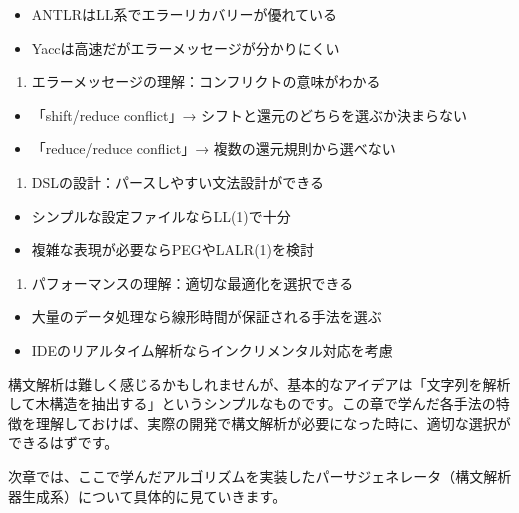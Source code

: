 \begin{itemize}
\tightlist
\item
  ANTLRはLL系でエラーリカバリーが優れている
\item
  Yaccは高速だがエラーメッセージが分かりにくい
\end{itemize}

\begin{enumerate}
\def\labelenumi{\arabic{enumi}.}
\setcounter{enumi}{1}
\tightlist
\item
  エラーメッセージの理解：コンフリクトの意味がわかる
\end{enumerate}

\begin{itemize}
\tightlist
\item
  「shift/reduce conflict」→ シフトと還元のどちらを選ぶか決まらない
\item
  「reduce/reduce conflict」→ 複数の還元規則から選べない
\end{itemize}

\begin{enumerate}
\def\labelenumi{\arabic{enumi}.}
\setcounter{enumi}{2}
\tightlist
\item
  DSLの設計：パースしやすい文法設計ができる
\end{enumerate}

\begin{itemize}
\tightlist
\item
  シンプルな設定ファイルならLL(1)で十分
\item
  複雑な表現が必要ならPEGやLALR(1)を検討
\end{itemize}

\begin{enumerate}
\def\labelenumi{\arabic{enumi}.}
\setcounter{enumi}{3}
\tightlist
\item
  パフォーマンスの理解：適切な最適化を選択できる
\end{enumerate}

\begin{itemize}
\tightlist
\item
  大量のデータ処理なら線形時間が保証される手法を選ぶ
\item
  IDEのリアルタイム解析ならインクリメンタル対応を考慮
\end{itemize}

構文解析は難しく感じるかもしれませんが、基本的なアイデアは「文字列を解析して木構造を抽出する」というシンプルなものです。この章で学んだ各手法の特徴を理解しておけば、実際の開発で構文解析が必要になった時に、適切な選択ができるはずです。

次章では、ここで学んだアルゴリズムを実装したパーサジェネレータ（構文解析器生成系）について具体的に見ていきます。
